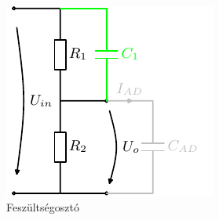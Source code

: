 \begin{figure}[htb]
\begingroup
\tikzset{}
 \centerline{\includegraphics[width=0.4\columnwidth]{.//Figures/Tikz/tikz_voltage_divider.pdf}}
 \endgroup
 \caption{Feszültségosztó}
 \label{fig:volt_div_sol}
\end{figure}
